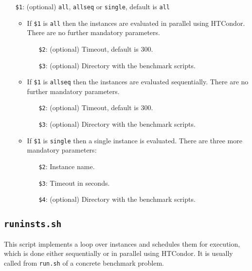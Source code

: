 \documentclass[a4paper]{article}
\begin{document}
		    \medskip{}
		    \begin{itemize}
				\item[{\tt \$1}:] (optional) {\tt all}, {\tt allseq} or {\tt single}, default is {\tt all}
					\begin {itemize}
						\item If {\tt \$1} is {\tt all} then the instances are evaluated in parallel using HTCondor. There are no further mandatory parameters.
							\begin{itemize}
								\item[{\tt \$2}:] (optional) Timeout, default is $300$.
								\item[{\tt \$3}:] (optional) Directory with the benchmark scripts.
							\end{itemize}
						\item If {\tt \$1} is {\tt allseq} then the instances are evaluated sequentially. There are no further mandatory parameters.
							\begin{itemize}
								\item[{\tt \$2}:] (optional) Timeout, default is $300$.
								\item[{\tt \$3}:] (optional) Directory with the benchmark scripts.
							\end{itemize}
						\item If {\tt \$1} is {\tt single} then a single instance is evaluated. There are three more mandatory parameters:
							\begin{itemize}
								\item[{\tt \$2}:] Instance name.
								\item[{\tt \$3}:] Timeout in seconds.
								\item[{\tt \$4}:] (optional) Directory with the benchmark scripts.
							\end{itemize}
					\end{itemize}
		    \end{itemize}
				
		\subsection{\tt runinsts.sh}
		\label{sec:architecture:runinsts}
		
		    This script implements a loop over instances and schedules them for execution,
		    which is done either sequentially or in parallel using HTCondor.
		    It is usually called from {\tt run.sh} of a concrete benchmark problem.
		    
\end{document}
